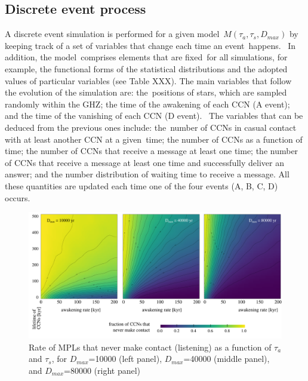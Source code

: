\documentclass[crop]{CSLB}
\newcommand{\ceti}{CCN}
\newcommand{\cetis}{CCNs}
\begin{document}
     



\subsection{Discrete event process}

A discrete event simulation is performed for a given model $M(\tau_a, \tau_s, D_{max})$ by keeping track of a set of variables that change each time an event happens. 
%
In addition, the model comprises elements that are fixed for all simulations, for example, the functional forms of the statistical distributions and the adopted values of particular variables (see Table XXX).
%
The main variables that follow the evolution of the simulation are: the positions of stars, which are sampled randomly within the GHZ; the time of the awakening of each \ceti{} (A event); and the time of the vanishing of each \ceti{} (D event). 
%
The variables that can be deduced from the previous ones include: the number of \cetis{} in casual contact with at least another \ceti{} at a given time; the number of \cetis{} as a function of time; the number of \cetis{} that receive a message at least one time; the number of \cetis{} that receive a message at least one time and successfully deliver an answer; and the number distribution of waiting time to receive a message.
%
All these quantities are updated each time one of the four events (A, B, C, D) occurs.   





          

           
  
\begin{figure} %
   \centering
   \includegraphics[width=\textwidth]{F_never_contact.pdf}
   \caption{
Rate of MPLs that never make contact (listening) as a
function of $\tau_a$ and $\tau_s$, for 
$D_{max}$=10000 (left panel),
$D_{max}$=40000 (middle panel), and
$D_{max}$=80000 (right panel)
%
   }
   \label{F_never_contact}
\end{figure}
 
\end{document}
